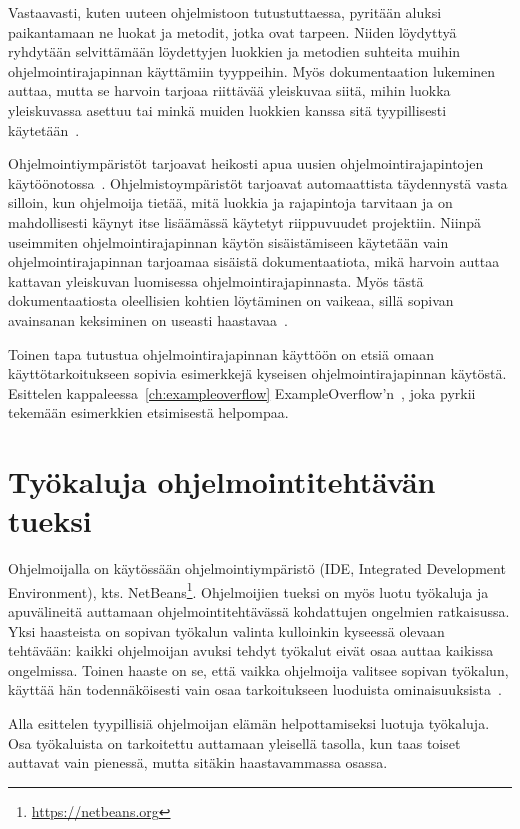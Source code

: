 \documentclass[finnish]{tktltiki2}
\theoremstyle{definition}
\theoremstyle{remark}
\begin{document}
Vastaavasti, kuten uuteen ohjelmistoon tutustuttaessa, pyritään aluksi paikantamaan ne luokat ja metodit, jotka ovat tarpeen. Niiden löydyttyä ryhdytään selvittämään löydettyjen luokkien ja metodien suhteita muihin ohjelmointirajapinnan käyttämiin tyyppeihin. Myös dokumentaation lukeminen auttaa, mutta se harvoin tarjoaa riittävää yleiskuvaa siitä, mihin luokka yleiskuvassa asettuu tai minkä muiden luokkien kanssa sitä tyypillisesti käytetään~\cite{asking-and-answering-api-questions}.

Ohjelmointiympäristöt tarjoavat heikosti apua uusien ohjelmointirajapintojen käytöönotossa~\cite{jungloid-mining}. Ohjelmistoympäristöt tarjoavat automaattista täydennystä vasta silloin, kun ohjelmoija tietää, mitä luokkia ja rajapintoja tarvitaan ja on mahdollisesti käynyt itse lisäämässä käytetyt riippuvuudet projektiin. Niinpä useimmiten ohjelmointirajapinnan käytön sisäistämiseen käytetään vain ohjelmointirajapinnan tarjoamaa sisäistä dokumentaatiota, mikä harvoin auttaa kattavan yleiskuvan luomisessa ohjelmointirajapinnasta. Myös tästä dokumentaatiosta oleellisien kohtien löytäminen on vaikeaa, sillä sopivan avainsanan keksiminen on useasti haastavaa~\cite{what-to-search-for}.

Toinen tapa tutustua ohjelmointirajapinnan käyttöön on etsiä omaan käyttötarkoitukseen sopivia esimerkkejä kyseisen ohjelmointirajapinnan käytöstä. Esittelen kappaleessa~\ref{ch:exampleoverflow} ExampleOverflow'n~\cite{example-overflow-social-media-for-code-recommendations}, joka pyrkii tekemään esimerkkien etsimisestä helpompaa.

\section{Työkaluja ohjelmointitehtävän tueksi}
\label{section:tokatk}
Ohjelmoijalla on käytössään ohjelmointiympäristö (IDE, Integrated Development Environment), kts. NetBeans\footnote{\url{https://netbeans.org}}. Ohjelmoijien tueksi on myös luotu työkaluja ja apuvälineitä auttamaan ohjelmointitehtävässä kohdattujen ongelmien ratkaisussa.
Yksi haasteista on sopivan työkalun valinta kulloinkin kyseessä olevaan tehtävään: kaikki ohjelmoijan avuksi tehdyt työkalut eivät osaa auttaa kaikissa ongelmissa. Toinen haaste on se, että vaikka ohjelmoija valitsee sopivan työkalun, käyttää hän todennäköisesti vain osaa tarkoitukseen luoduista ominaisuuksista~\cite{whyline}.

Alla esittelen tyypillisiä ohjelmoijan elämän helpottamiseksi luotuja työkaluja. Osa työkaluista on tarkoitettu auttamaan yleisellä tasolla, kun taas toiset auttavat vain pienessä, mutta sitäkin haastavammassa osassa.
\end{document}

